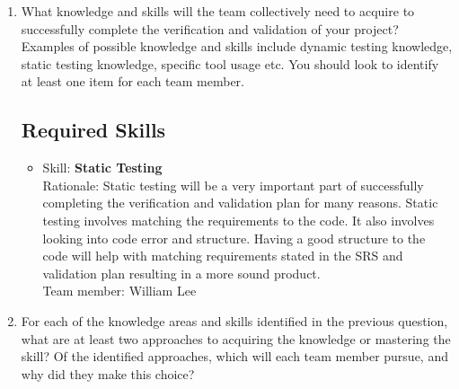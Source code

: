 \documentclass[12pt, titlepage]{article}
\begin{document}
	\begin{enumerate}
		\item What knowledge and skills will the team collectively need to acquire to
		successfully complete the verification and validation of your project?
		Examples of possible knowledge and skills include dynamic testing knowledge,
		static testing knowledge, specific tool usage etc.  You should look to
		identify at least one item for each team member.
		\subsection{Required Skills}
		\begin{itemize}
			\item Skill: \textbf{Static Testing}
			\\ Rationale: Static testing will be a very important part of successfully completing the verification and validation plan for many reasons. Static testing involves matching the requirements to the code. It also involves looking into code error and structure. Having a good structure to the code will help with matching requirements stated in the SRS and validation plan resulting in a more sound product.
			\\ Team member: William Lee
		\end{itemize}
		\item For each of the knowledge areas and skills identified in the previous
		question, what are at least two approaches to acquiring the knowledge or
		mastering the skill?  Of the identified approaches, which will each team
		member pursue, and why did they make this choice?

\end{enumerate}
\end{document}
